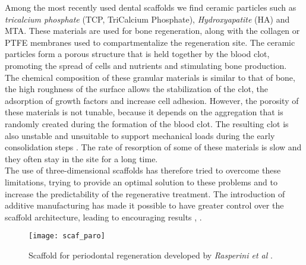 Among the most recently used dental scaffolds we find ceramic particles such as \emph{tricalcium phosphate} (TCP, TriCalcium Phosphate), \emph{Hydroxyapatite} (HA) and MTA. These materials are used for bone regeneration, along with the collagen or PTFE membranes used to compartmentalize the regeneration site. The ceramic particles form a porous structure that is held together by the blood clot, promoting the spread of cells and nutrients and stimulating bone production. \\ The chemical composition of these granular materials is similar to that of bone, the high roughness of the surface allows the stabilization of the clot, the adsorption of growth factors and increase cell adhesion. However, the porosity of these materials is not tunable, because it depends on the aggregation that is randomly created during the formation of the blood clot. The resulting clot is also unstable and unsuitable to support mechanical loads during the early consolidation steps \parencite{Reference131}. The rate of resorption of some of these materials is slow and they often stay in the site for a long time. \\
The use of three-dimensional scaffolds has therefore tried to overcome these limitations, trying to provide an optimal solution to these problems and to increase the predictability of the regenerative treatment. The introduction of additive manufacturing has made it possible to have greater control over the scaffold architecture, leading to encouraging results \parencite{Reference136}, \parencite{Reference137}.\\
\begin{figure}[h]
\vspace{-10pt}
	\begin{center}
	\texttt{[image: scaf\_paro]}
    \caption{Scaffold for periodontal regeneration developed by \emph{Rasperini et al} \parencite{Reference134}.}
    \label{fig:scaf_paro}
	\end{center}
\vspace{-20pt}
\end{figure}

